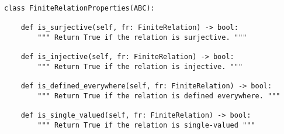 \begin{verbatim}
class FiniteRelationProperties(ABC):

    def is_surjective(self, fr: FiniteRelation) -> bool:
        """ Return True if the relation is surjective. """

    def is_injective(self, fr: FiniteRelation) -> bool:
        """ Return True if the relation is injective. """

    def is_defined_everywhere(self, fr: FiniteRelation) -> bool:
        """ Return True if the relation is defined everywhere. """

    def is_single_valued(self, fr: FiniteRelation) -> bool:
        """ Return True if the relation is single-valued """
\end{verbatim}